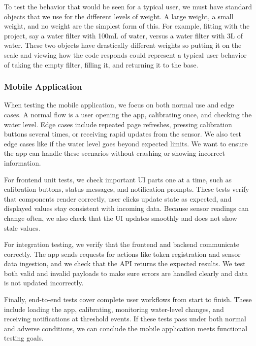 To test the behavior that would be seen for a typical user, we must have standard objects that we use for the different levels of weight. A large weight, a small weight, and no weight are the simplest form of this. For example, fitting with the project, say a water filter with 100mL of water, versus a water filter with 3L of water. These two objects have drastically different weights so putting it on the scale and viewing how the code responds could represent a typical user behavior of taking the empty filter, filling it, and returning it to the base. 


\subsubsection{Mobile Application}

When testing the mobile application, we focus on both normal use and edge cases. A normal flow is a user opening the app, calibrating once, and checking the water level. Edge cases include repeated page refreshes, pressing calibration buttons several times, or receiving rapid updates from the sensor. We also test edge cases like if the water level goes beyond expected limits. We want to ensure the app can handle these scenarios without crashing or showing incorrect information.

For frontend unit tests, we check important UI parts one at a time, such as calibration buttons, status messages, and notification prompts. These tests verify that components render correctly, user clicks update state as expected, and displayed values stay consistent with incoming data. Because sensor readings can change often, we also check that the UI updates smoothly and does not show stale values.

For integration testing, we verify that the frontend and backend communicate correctly. The app sends requests for actions like token registration and sensor data ingestion, and we check that the API returns the expected results. We test both valid and invalid payloads to make sure errors are handled clearly and data is not updated incorrectly.

Finally, end-to-end tests cover complete user workflows from start to finish. These include loading the app, calibrating, monitoring water-level changes, and receiving notifications at threshold events. If these tests pass under both normal and adverse conditions, we can conclude the mobile application meets functional testing goals.
